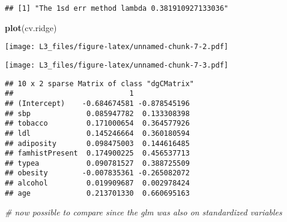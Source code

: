 \documentclass[
]{article}
\newenvironment{Shaded}{\begin{snugshade}}{\end{snugshade}}
\newcommand{\CommentTok}[1]{\textcolor[rgb]{0.56,0.35,0.01}{\textit{#1}}}
\newcommand{\DataTypeTok}[1]{\textcolor[rgb]{0.13,0.29,0.53}{#1}}
\newcommand{\FloatTok}[1]{\textcolor[rgb]{0.00,0.00,0.81}{#1}}
\newcommand{\KeywordTok}[1]{\textcolor[rgb]{0.13,0.29,0.53}{\textbf{#1}}}
\newcommand{\NormalTok}[1]{#1}
\newcommand{\OperatorTok}[1]{\textcolor[rgb]{0.81,0.36,0.00}{\textbf{#1}}}
\newcommand{\OtherTok}[1]{\textcolor[rgb]{0.56,0.35,0.01}{#1}}
\newcommand{\StringTok}[1]{\textcolor[rgb]{0.31,0.60,0.02}{#1}}
\begin{document}
\begin{verbatim}
## [1] "The 1sd err method lambda 0.381910927133036"
\end{verbatim}

\begin{Shaded}
\begin{Highlighting}[]
\KeywordTok{plot}\NormalTok{(cv.ridge)}
\end{Highlighting}
\end{Shaded}

\texttt{[image: L3\_files/figure-latex/unnamed-chunk-7-2.pdf]}

\begin{Shaded}
\end{Shaded}

\texttt{[image: L3\_files/figure-latex/unnamed-chunk-7-3.pdf]}

\begin{Shaded}
\end{Shaded}

\begin{verbatim}
## 10 x 2 sparse Matrix of class "dgCMatrix"
##                           1             
## (Intercept)    -0.684674581 -0.878545196
## sbp             0.085947782  0.133308398
## tobacco         0.171000654  0.364577926
## ldl             0.145246664  0.360180594
## adiposity       0.098475003  0.144616485
## famhistPresent  0.174900225  0.456537713
## typea           0.090781527  0.388725509
## obesity        -0.007835361 -0.265082072
## alcohol         0.019909687  0.002978424
## age             0.213701330  0.660695163
\end{verbatim}

\begin{Shaded}
\begin{Highlighting}[]
\CommentTok{# now possible to compare since the glm was also on standardized variables}
\end{Highlighting}
\end{Shaded}
\end{document}
